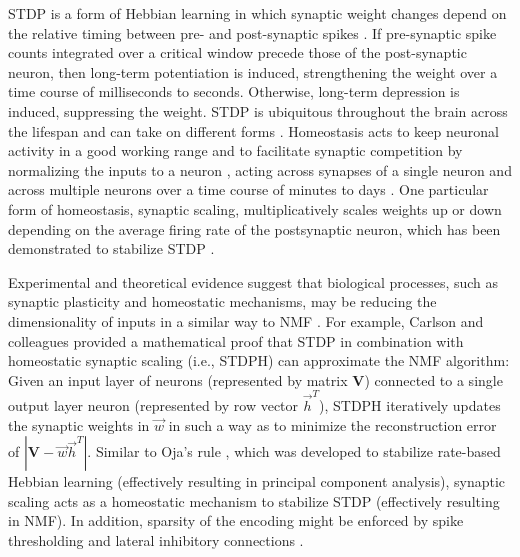 \Ac{STDP} is a form of Hebbian learning in which synaptic weight changes depend on the relative timing between pre- and post-synaptic spikes
\cite{BiPoo1998,SongAbbott2000}.
If pre-synaptic spike counts integrated over a critical window precede those of the post-synaptic neuron, then long-term potentiation is induced, strengthening the weight over a time course of milliseconds to seconds. Otherwise, long-term depression is induced, suppressing the weight. \Ac{STDP} is ubiquitous throughout the brain across the lifespan and can take on different forms \cite{Caporale2008STDP,Holtmaat2009STDP}.
%
Homeostasis acts to keep neuronal activity in a good working range \cite{Watt2010}
and to facilitate synaptic competition by normalizing the inputs to a neuron \cite{chistiakova2015},
acting across synapses of a single neuron and across multiple neurons
over a time course of minutes to days
\cite{turrigiano1998}.
One particular form of homeostasis, synaptic scaling, multiplicatively scales weights up or down
depending on the average firing rate of the postsynaptic neuron, which has
been demonstrated to stabilize \ac{STDP} \cite{Carlson2013,Buonomano2005,VanRossum2000}.

Experimental and theoretical evidence suggest that biological processes, such as synaptic plasticity and homeostatic mechanisms, may be reducing the dimensionality of inputs in a similar way to \ac{NMF}
\cite{Perrinet2010,Clopath2010,IzhikevichDesai2003}.
For example, Carlson and colleagues \cite{Carlson2013} provided a mathematical proof that
\ac{STDP} in combination with homeostatic synaptic scaling (i.e., \ac{STDPH})
can approximate the \ac{NMF} algorithm:
Given an input layer of neurons (represented by matrix \textbf{V}) connected to a single output layer neuron (represented by row vector $\vec{h}^T$), \ac{STDPH} iteratively updates the synaptic weights in $\vec{w}$ in such a way as to minimize the reconstruction error of $|\mathbf{V} - \vec{w} \vec{h}^T|$.
Similar to Oja's rule \cite{Oja1982}, which was developed to stabilize 
rate-based Hebbian learning
(effectively resulting in principal component analysis),
synaptic scaling acts as a homeostatic mechanism to stabilize \ac{STDP}
(effectively resulting in \ac{NMF}).
In addition, sparsity of the encoding might be enforced by spike thresholding \cite{Rozell2008} and lateral inhibitory connections \cite{Coultrip1992}.

